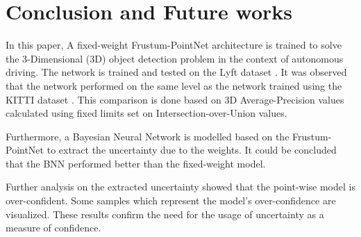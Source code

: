 \documentclass[10pt,twocolumn,letterpaper]{article}
\begin{document}
\section{Conclusion and Future works}
In this paper, A fixed-weight Frustum-PointNet \cite{FPointnet2018} architecture is trained to solve the 3-Dimensional (3D) object detection problem in the context of autonomous driving. The network is trained and tested on the Lyft dataset \cite{Lyft2019}. It was observed that the network performed on the same level as the network trained using the KITTI dataset \cite{KITTI2012}. This comparison is done based on 3D Average-Precision values calculated using fixed limits set on Intersection-over-Union values.
    
Furthermore, a Bayesian Neural Network is modelled based on the Frustum-PointNet \cite{FPointnet2018} to extract the uncertainty due to the weights. It could be concluded that the BNN performed better than the fixed-weight model.

Further analysis on the extracted uncertainty showed that the point-wise model is over-confident. Some samples which represent the model's over-confidence are visualized. These results confirm the need for the usage of uncertainty as a measure of confidence.


{\small


}
\end{document}
